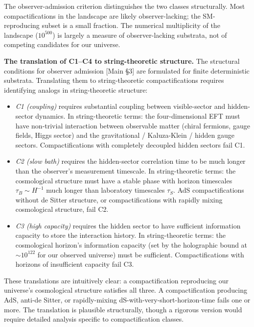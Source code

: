 \documentclass[
]{article}
\begin{document}
The observer-admission criterion distinguishes the two classes
structurally. Most compactifications in the landscape are likely
observer-lacking; the SM-reproducing subset is a small fraction. The
numerical multiplicity of the landscape (\(10^{500}\)) is largely a
measure of observer-lacking substrata, not of competing candidates for
our universe.

\textbf{The translation of C1--C4 to string-theoretic structure.} The
structural conditions for observer admission {[}Main §3{]} are
formulated for finite deterministic substrata. Translating them to
string-theoretic compactifications requires identifying analogs in
string-theoretic structure:

\begin{itemize}
\item
  \emph{C1 (coupling)} requires substantial coupling between
  visible-sector and hidden-sector dynamics. In string-theoretic terms:
  the four-dimensional EFT must have non-trivial interaction between
  observable matter (chiral fermions, gauge fields, Higgs sector) and
  the gravitational / Kaluza-Klein / hidden gauge sectors.
  Compactifications with completely decoupled hidden sectors fail C1.
\item
  \emph{C2 (slow bath)} requires the hidden-sector correlation time to
  be much longer than the observer's measurement timescale. In
  string-theoretic terms: the cosmological structure must have a stable
  phase with horizon timescales \(\tau_B \sim H^{-1}\) much longer than
  laboratory timescales \(\tau_S\). AdS compactifications without de
  Sitter structure, or compactifications with rapidly mixing
  cosmological structure, fail C2.
\item
  \emph{C3 (high capacity)} requires the hidden sector to have
  sufficient information capacity to store the interaction history. In
  string-theoretic terms: the cosmological horizon's information
  capacity (set by the holographic bound at \(\sim 10^{122}\) for our
  observed universe) must be sufficient. Compactifications with horizons
  of insufficient capacity fail C3.
\end{itemize}

These translations are intuitively clear: a compactification reproducing
our universe's cosmological structure satisfies all three. A
compactification producing AdS, anti-de Sitter, or rapidly-mixing
dS-with-very-short-horizon-time fails one or more. The translation is
plausible structurally, though a rigorous version would require detailed
analysis specific to compactification classes.
\end{document}
